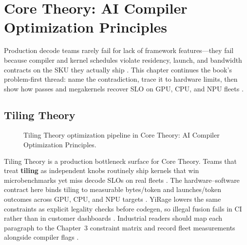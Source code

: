 \chapter{Core Theory: AI Compiler Optimization Principles}
\label{chap:ch13}

Production decode teams rarely fail for lack of framework features---they fail because compiler and kernel schedules violate residency, launch, and bandwidth contracts on the SKU they actually ship \citep{patel2025llminference,nvidia2022hopper}. This chapter continues the book's problem-first thread: name the contradiction, trace it to hardware limits, then show how passes and megakernels recover SLO on GPU, CPU, and NPU fleets \citep{taxbreak2026,semianalysis2024tma}.

\section{Tiling Theory}
\label{sec:tiling_theory}
\begin{figure}[t]
\centering
{}
\caption{Tiling Theory optimization pipeline in Core Theory: AI Compiler Optimization Principles.}
\label{fig:tiling_theory_pipeline}
\end{figure}


Tiling Theory is a production bottleneck surface for Core Theory. Teams that treat \textbf{tiling} as independent knobs routinely ship kernels that win microbenchmarks yet miss decode SLOs on real fleets \citep{patel2025llminference,nvidia2022hopper}. The hardware--software contract here binds tiling to measurable bytes/token and launches/token outcomes across GPU, CPU, and NPU targets \citep{taxbreak2026,semianalysis2024tma}. YiRage lowers the same constraints as explicit legality checks before codegen, so illegal fusion fails in CI rather than in customer dashboards \citep{memoryfloor2026,amd2024xdna}. Industrial readers should map each paragraph to the Chapter~3 constraint matrix and record fleet measurements alongside compiler flags \citep{nvidia2022hopper,amd2024aie}.

